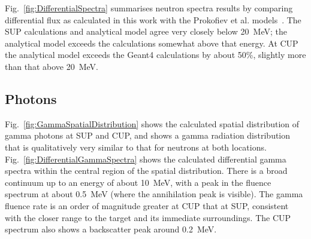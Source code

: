 \documentclass[peerreviewca,11pt,a4paper]{IEEEtran}
\begin{document}
Fig.~\ref{fig:DifferentialSpectra} summarises neutron spectra results by comparing differential flux as calculated in this work with the Prokofiev et al. models~\cite{Prokofiev2009,Prokofiev2014}.
The SUP calculations and analytical model agree very closely below \SI{20}{\MeV}; the analytical model exceeds the calculations somewhat above that energy.
At CUP the analytical model exceeds the Geant4 calculations by about 50\%, slightly more than that above \SI{20}{\MeV}.

\subsection{Photons}
Fig.~\ref{fig:GammaSpatialDistribution} shows the calculated spatial distribution of gamma photons at SUP and CUP, and shows a gamma radiation distribution that is qualitatively very similar to that for neutrons at both locations.
Fig.~\ref{fig:DifferentialGammaSpectra} shows the calculated differential gamma spectra within the central region of the spatial distribution.
There is a broad continuum up to an energy of about \SI{10}{\MeV}, with a peak in the fluence spectrum at about \SI{0.5}{\MeV} (where the annihilation peak is visible).
The gamma fluence rate is an order of magnitude greater at CUP that at SUP, consistent with the closer range to the target and its immediate surroundings.
The CUP spectrum also shows a backscatter peak around \SI{0.2}{\MeV}.
\end{document}
